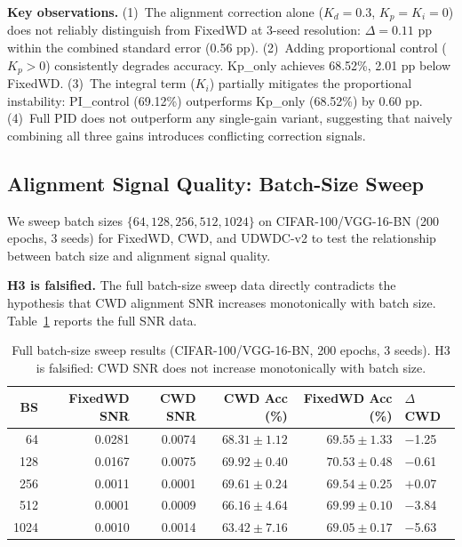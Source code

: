 \documentclass{article}
\begin{document}
\textbf{Key observations.} (1)~The alignment correction alone ($K_d = 0.3$, $K_p = K_i = 0$) does not reliably distinguish from FixedWD at 3-seed resolution: $\Delta = 0.11$ pp within the combined standard error (0.56 pp). (2)~Adding proportional control ($K_p > 0$) consistently degrades accuracy. Kp\_only achieves 68.52\%, 2.01 pp below FixedWD. (3)~The integral term ($K_i$) partially mitigates the proportional instability: PI\_control (69.12\%) outperforms Kp\_only (68.52\%) by 0.60 pp. (4)~Full PID does not outperform any single-gain variant, suggesting that naively combining all three gains introduces conflicting correction signals.

\subsection{Alignment Signal Quality: Batch-Size Sweep}

We sweep batch sizes $\{64, 128, 256, 512, 1024\}$ on CIFAR-100/VGG-16-BN (200 epochs, 3 seeds) for FixedWD, CWD, and UDWDC-v2 to test the relationship between batch size and alignment signal quality.

\textbf{H3 is falsified.} The full batch-size sweep data directly contradicts the hypothesis that CWD alignment SNR increases monotonically with batch size. Table~\ref{tab:batchsize} reports the full SNR data.

\begin{table}[t]
\caption{Full batch-size sweep results (CIFAR-100/VGG-16-BN, 200 epochs, 3 seeds). H3 is falsified: CWD SNR does not increase monotonically with batch size.}
\label{tab:batchsize}
\centering
\small
\begin{tabular}{rrrrrl}
\toprule
BS & FixedWD SNR & CWD SNR & CWD Acc (\%) & FixedWD Acc (\%) & $\Delta$ CWD \\
\midrule
64 & 0.0281 & 0.0074 & $68.31 \pm 1.12$ & $69.55 \pm 1.33$ & $-$1.25 \\
128 & 0.0167 & 0.0075 & $69.92 \pm 0.40$ & $70.53 \pm 0.48$ & $-$0.61 \\
256 & 0.0011 & 0.0001 & $69.61 \pm 0.24$ & $69.54 \pm 0.25$ & $+$0.07 \\
512 & 0.0001 & 0.0009 & $66.16 \pm 4.64$ & $69.99 \pm 0.10$ & $-$3.84 \\
1024 & 0.0010 & 0.0014 & $63.42 \pm 7.16$ & $69.05 \pm 0.17$ & $-$5.63 \\
\bottomrule
\end{tabular}
\end{table}
\end{document}
